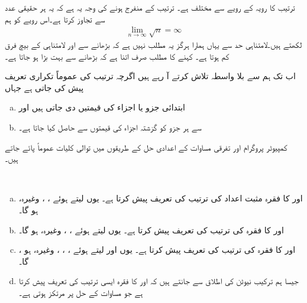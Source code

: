 ترتیب  کا رویہ  کے رویے سے مختلف ہے۔ ترتیب  کے منفرج ہونے کی وجہ یہ ہے کہ یہ ہر حقیقی عدد  سے تجاوز کرتا ہے۔اس رویے کو ہم
\begin{align*}
\lim_{n\to\infty}\sqrt{n}=\infty
\end{align*}
لکھتے ہیں۔لامتناہی حد سے یہاں ہمارا ہرگز یہ مطلب نہیں ہے کہ  بڑھانے سے  اور لامتناہی کے بیچ فرق کم ہوتا ہے۔ کہنے کا مطلب صرف اتنا ہے کہ   بڑھانے سے  بہت بڑا ہو جاتا ہے۔ 

اب تک ہم   سے بلا واسطہ  تلاش کرتے آ رہے ہیں اگرچہ ترتیب کی عموماً تکراری تعریف  پیش کی جاتی ہے جہاں
\begin{enumerate}[a.]
\item
ابتدائی جزو یا اجزاء کی قیمتیں دی جاتی ہیں اور
\item
{} سے ہر جزو کو گزشتہ اجزاء کی قیمتوں سے حاصل کیا جاتا ہے۔ 
\end{enumerate}

کمپیوٹر پروگرام اور تفرقی مساوات کے اعدادی حل کے طریقوں میں توالی کلیات عموماً پائے جاتے ہیں۔

\\
\begin{enumerate}[a.]
\item
{} اور  کا فقرہ مثبت اعداد کی ترتیب  کی تعریف پیش کرتا ہے۔ یوں  لیتے ہوئے ، ، وغیرہ، ہو گا۔
\item
  اور  کا فقرہ  کی ترتیب  کی تعریف پیش کرتا ہے۔ یوں  لیتے ہوئے ، ،  وغیرہ، ہو گا۔
\item
{}،  اور  کا فقرہ  کی ترتیب   کی تعریف پیش کرتا ہے۔ یوں  اور  لیتے ہوئے ، ، ، وغیرہ، ہو گا۔
\item
جیسا ہم ترکیب نیوٹن کی اطلاق سے جانتے ہیں کہ  اور  کا فقرہ ایسی ترتیب کی تعریف پیش کرتا ہے جو مساوات  کے حل پر مرتکز ہوتی ہے۔
\end{enumerate}

